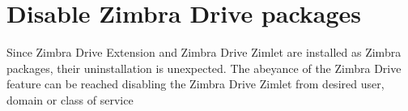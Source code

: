 \section{Disable Zimbra Drive packages}\label{==sec:disablePackages==}

Since Zimbra Drive Extension and Zimbra Drive Zimlet are installed as Zimbra packages,
their uninstallation is unexpected. The abeyance of the Zimbra Drive feature
can be reached disabling the Zimbra Drive Zimlet from desired user, domain or class of service
